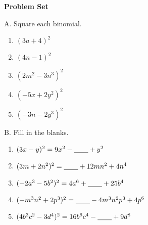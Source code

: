 \textbf{Problem Set}

\vspce

A. Square each binomial.   
\begin{enumerate}

\item \hspce $(3a + 4)^2$
\item \hspce $(4n - 1)^2$
\item \hspce $(2m^{2} - 3n^{3})^2$
\item \hspce $(-5x + 2y^{2})^2$
\item \hspce $(-3n - 2y^{3})^2$

\end{enumerate}

B. Fill in the blanks. 
\begin{enumerate}[label = \arabic*. ]
\item \hspce $(3x - y)^{2} = 9x^{2} - \underline{\hspace{2em}} + y^2$
\item \hspce $(3m + 2n^2)^{2} = \underline{\hspace{2em}} + 12mn^2 + 4n^4 $
\item \hspce $(-2a^3 - 5b^2)^{2} = 4a^6 + \underline{\hspace{2em}} + 25b^4 $
\item \hspce $(-m^3n^2 + 2p^3 )^{2} = \underline{\hspace{2em}} - 4m^3n^2p^3 + 4p^6$
\item \hspce $(4b^3c^2 - 3d^4)^{2} = 16b^6c^4 - \underline{\hspace{2em}} + 9d^8 $
\end{enumerate}  